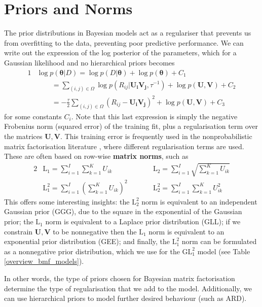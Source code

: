 \documentclass[letterpaper]{article} %
\newcommand{\U}{\boldsymbol U}
\newcommand{\Ui}{\boldsymbol{U_i}}
\newcommand{\V}{\boldsymbol V}
\newcommand{\Vj}{\boldsymbol{V_j}}
\newcommand{\btheta}{\boldsymbol \theta}
\newcommand{\sumOmega}{\sum_{(i,j) \in \Omega}}
\begin{document}
\section{Priors and Norms} \label{PriorsNorms}
	The prior distributions in Bayesian models act as a regulariser that prevents us from overfitting to the data, preventing poor predictive performance. We can write out the expression of the log posterior of the parameters, which for a Gaussian likelihood and no hierarchical priors becomes
	\begin{alignat*}{1}
		& \log p(\btheta|D) = \log p(D|\btheta) + \log p(\btheta) + C_1 \\
		&\hspace{25pt} = \sumOmega \log p(R_{ij}|\Ui \Vj, \tau^{-1}) + \log p(\U, \V) + C_2 \\
		&\hspace{25pt} = - \frac{\tau}{2} \sumOmega ( R_{ij} - \Ui \Vj)^2 + \log p(\U, \V) + C_3
	\end{alignat*}
	for some constants $C_i$. Note that this last expression is simply the negative Frobenius norm (squared error) of the training fit, plus a regularisation term over the matrices $\U, \V$. This training error is frequently used in the nonprobabilistic matrix factorisation literature \cite{Lee2000,Pauca2004,Pauca2006}, where different regularisation terms are used. 
	These are often based on row-wise \textbf{matrix norms}, such as
	\begin{alignat*}{2}
		& \text{L}_1 = \sum_{i=1}^I \sum_{k=1}^K U_{ik}
		\quad\quad && \text{L}_2 = \sum_{i=1}^I \sqrt{\sum_{k=1}^K U_{ik}} \\
		& \text{L}^2_1 = \sum_{i=1}^I (\sum_{k=1}^K U_{ik})^2
		\quad\quad && \text{L}^2_2 = \sum_{i=1}^I \sum_{k=1}^K U_{ik}^2
	\end{alignat*}
	This offers some interesting insights: the $\text{L}^2_2$ norm is equivalent to an independent Gaussian prior (GGG), due to the square in the exponential of the Gaussian prior; the $\text{L}_1$ norm is equivalent to a Laplace prior distribution (GLL); if we constrain $\U, \V$ to be nonnegative then the $\text{L}_1$ norm is equivalent to an exponential prior distribution (GEE); and finally, the $\text{L}^2_1$ norm can be formulated as a nonnegative prior distribution, which we use for the $\text{GL}^2_1$ model (see Table \ref{overview_bmf_models}).
	
	In other words, the type of priors chosen for Bayesian matrix factorisation determine the type of regularisation that we add to the model. Additionally, we can use hierarchical priors to model further desired behaviour (such as ARD).
\end{document}

